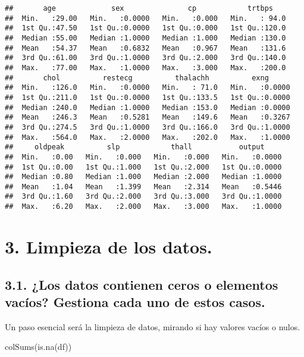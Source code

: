 \documentclass[
]{article}
\newenvironment{Shaded}{\begin{snugshade}}{\end{snugshade}}
\newcommand{\FunctionTok}[1]{\textcolor[rgb]{0.94,0.94,0.56}{#1}}
\newcommand{\NormalTok}[1]{\textcolor[rgb]{0.80,0.80,0.80}{#1}}
\begin{document}
\begin{verbatim}
##       age             sex               cp            trtbps     
##  Min.   :29.00   Min.   :0.0000   Min.   :0.000   Min.   : 94.0  
##  1st Qu.:47.50   1st Qu.:0.0000   1st Qu.:0.000   1st Qu.:120.0  
##  Median :55.00   Median :1.0000   Median :1.000   Median :130.0  
##  Mean   :54.37   Mean   :0.6832   Mean   :0.967   Mean   :131.6  
##  3rd Qu.:61.00   3rd Qu.:1.0000   3rd Qu.:2.000   3rd Qu.:140.0  
##  Max.   :77.00   Max.   :1.0000   Max.   :3.000   Max.   :200.0  
##       chol          restecg          thalachh          exng       
##  Min.   :126.0   Min.   :0.0000   Min.   : 71.0   Min.   :0.0000  
##  1st Qu.:211.0   1st Qu.:0.0000   1st Qu.:133.5   1st Qu.:0.0000  
##  Median :240.0   Median :1.0000   Median :153.0   Median :0.0000  
##  Mean   :246.3   Mean   :0.5281   Mean   :149.6   Mean   :0.3267  
##  3rd Qu.:274.5   3rd Qu.:1.0000   3rd Qu.:166.0   3rd Qu.:1.0000  
##  Max.   :564.0   Max.   :2.0000   Max.   :202.0   Max.   :1.0000  
##     oldpeak          slp            thall           output      
##  Min.   :0.00   Min.   :0.000   Min.   :0.000   Min.   :0.0000  
##  1st Qu.:0.00   1st Qu.:1.000   1st Qu.:2.000   1st Qu.:0.0000  
##  Median :0.80   Median :1.000   Median :2.000   Median :1.0000  
##  Mean   :1.04   Mean   :1.399   Mean   :2.314   Mean   :0.5446  
##  3rd Qu.:1.60   3rd Qu.:2.000   3rd Qu.:3.000   3rd Qu.:1.0000  
##  Max.   :6.20   Max.   :2.000   Max.   :3.000   Max.   :1.0000
\end{verbatim}

\hypertarget{limpieza-de-los-datos.}{%
\section{3. Limpieza de los datos.}\label{limpieza-de-los-datos.}}

\hypertarget{los-datos-contienen-ceros-o-elementos-vacuxedos-gestiona-cada-uno-de-estos-casos.}{%
\subsection{3.1. ¿Los datos contienen ceros o elementos vacíos? Gestiona
cada uno de estos
casos.}\label{los-datos-contienen-ceros-o-elementos-vacuxedos-gestiona-cada-uno-de-estos-casos.}}

Un paso esencial será la limpieza de datos, mirando si hay valores
vacíos o nulos.

\begin{Shaded}
\begin{Highlighting}[]
\FunctionTok{colSums}\NormalTok{(}\FunctionTok{is.na}\NormalTok{(df))}
\end{Highlighting}
\end{Shaded}
\end{document}
